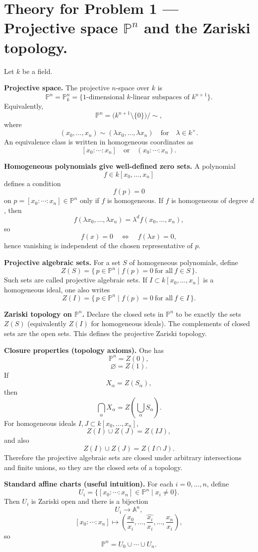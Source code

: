 \documentclass[12pt,a4paper]{article}
\theoremstyle{plain}
\theoremstyle{definition}      %
\begin{document}
\section*{Theory for Problem 1 — Projective space $\mathbb{P}^n$ and the Zariski topology.}

Let $k$ be a field.

\textbf{Projective space.}
The projective $n$-space over $k$ is
\[
\mathbb{P}^n
=
\mathbb{P}^n_k
=
\{\text{1-dimensional $k$-linear subspaces of }k^{n+1}\}.
\]
Equivalently,
\[
\mathbb{P}^n
=
\bigl(k^{n+1}\setminus\{0\}\bigr)\big/\sim,
\]
where
\[
(x_0,\dots,x_n)\sim (\lambda x_0,\dots,\lambda x_n)
\quad\text{for}\quad
\lambda\in k^\times.
\]
An equivalence class is written in homogeneous coordinates as
\[
[x_0:\cdots:x_n]
\quad\text{or}\quad
(x_0:\cdots:x_n).
\]

\textbf{Homogeneous polynomials give well-defined zero sets.}
A polynomial
\[
f\in k[x_0,\dots,x_n]
\]
defines a condition
\[
f(p)=0
\]
on $p=[x_0:\cdots:x_n]\in \mathbb{P}^n$ only if $f$ is homogeneous.
If $f$ is homogeneous of degree $d$, then
\[
f(\lambda x_0,\dots,\lambda x_n)
=
\lambda^d f(x_0,\dots,x_n),
\]
so
\[
f(x)=0
\quad\Longleftrightarrow\quad
f(\lambda x)=0,
\]
hence vanishing is independent of the chosen representative of $p$.

\textbf{Projective algebraic sets.}
For a set $S$ of homogeneous polynomials, define
\[
Z(S)
=
\{\,p\in \mathbb{P}^n \mid f(p)=0\ \text{for all}\ f\in S\,\}.
\]
Such sets are called projective algebraic sets.
If $I\subset k[x_0,\dots,x_n]$ is a homogeneous ideal, one also writes
\[
Z(I)
=
\{\,p\in \mathbb{P}^n \mid f(p)=0\ \text{for all}\ f\in I\,\}.
\]

\textbf{Zariski topology on $\mathbb{P}^n$.}
Declare the closed sets in $\mathbb{P}^n$ to be exactly the sets $Z(S)$ (equivalently $Z(I)$ for homogeneous ideals).
The complements of closed sets are the open sets.
This defines the projective Zariski topology.

\textbf{Closure properties (topology axioms).}
One has
\[
\mathbb{P}^n
=
Z(0),
\]
\[
\varnothing
=
Z(1).
\]
If
\[
X_\alpha
=
Z(S_\alpha),
\]
then
\[
\bigcap_\alpha X_\alpha
=
Z\!\left(\bigcup_\alpha S_\alpha\right).
\]
For homogeneous ideals $I,J\subset k[x_0,\dots,x_n]$,
\[
Z(I)\cup Z(J)
=
Z(IJ),
\]
and also
\[
Z(I)\cup Z(J)
=
Z(I\cap J).
\]
Therefore the projective algebraic sets are closed under arbitrary intersections and finite unions, so they are the closed sets of a topology.

\textbf{Standard affine charts (useful intuition).}
For each $i=0,\dots,n$, define
\[
U_i
=
\{[x_0:\cdots:x_n]\in \mathbb{P}^n \mid x_i\neq 0\}.
\]
Then $U_i$ is Zariski open and there is a bijection
\[
U_i
\longrightarrow
\mathbb{A}^n,
\]
\[
[x_0:\cdots:x_n]
\longmapsto
\left(\frac{x_0}{x_i},\dots,\widehat{\frac{x_i}{x_i}},\dots,\frac{x_n}{x_i}\right),
\]
so
\[
\mathbb{P}^n
=
U_0\cup\cdots\cup U_n.
\]
\end{document}
